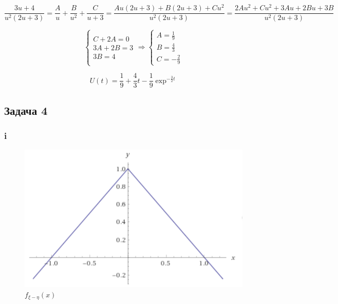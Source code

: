 \documentclass[a4paper,12pt]{article}
\begin{document}
\[ 
\frac { 3 u + 4 } { u ^ { 2 } ( 2 u + 3 ) } = \frac { A } { u } + \frac { B } { u ^ { 2 } } + \frac { C } { u + 3 }  = \frac { A u ( 2 u + 3 ) + B ( 2 u + 3 ) + C u ^ { 2 } } { u ^ { 2 } ( 2 u + 3 ) } = \frac { 2 A u ^ { 2 } + C u ^ { 2 } + 3 A u + 2 B u + 3 B } { u ^ { 2 } ( 2 u + 3 ) }
 \]

\begin{equation}
\left\{ \begin{array} { l } { C + 2 A = 0 } \\ { 3 A + 2 B = 3 } \\ { 3 B = 4 } \end{array} \Rightarrow \left\{ \begin{array} { l } { A = \frac { 1 } { 9 } } \\ { B = \frac { 4 } { 3 } } \\ { C = - \frac { 2 } { 9 } } \end{array} \right. \right.
\end{equation}


\[ U(t) = \frac{1}{9} + \frac{4}{3}t - \frac{1}{9}\exp^{-\frac{3}{2}t}\]

\subsection{Задача 4}
\subsubsection{i}

 \begin{figure}
	\includegraphics[width=\linewidth]{13}
	\caption{$  f_{\xi - \eta}(x) $}
	\label{minmax}
\end{figure}
\end{document}
